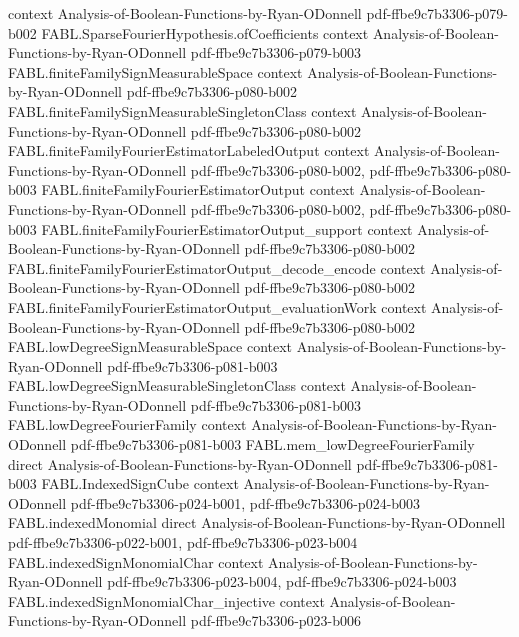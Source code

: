 \begin{theorem}
  {context}
  {Analysis-of-Boolean-Functions-by-Ryan-ODonnell}
  {pdf-ffbe9c7b3306-p079-b002}
\proofstep
  {FABL.SparseFourierHypothesis.ofCoefficients}
  {context}
  {Analysis-of-Boolean-Functions-by-Ryan-ODonnell}
  {pdf-ffbe9c7b3306-p079-b003}
\proofstep
  {FABL.finiteFamilySignMeasurableSpace}
  {context}
  {Analysis-of-Boolean-Functions-by-Ryan-ODonnell}
  {pdf-ffbe9c7b3306-p080-b002}
\proofstep
  {FABL.finiteFamilySignMeasurableSingletonClass}
  {context}
  {Analysis-of-Boolean-Functions-by-Ryan-ODonnell}
  {pdf-ffbe9c7b3306-p080-b002}
\proofstep
  {FABL.finiteFamilyFourierEstimatorLabeledOutput}
  {context}
  {Analysis-of-Boolean-Functions-by-Ryan-ODonnell}
  {pdf-ffbe9c7b3306-p080-b002,
    pdf-ffbe9c7b3306-p080-b003}
\proofstep
  {FABL.finiteFamilyFourierEstimatorOutput}
  {context}
  {Analysis-of-Boolean-Functions-by-Ryan-ODonnell}
  {pdf-ffbe9c7b3306-p080-b002,
    pdf-ffbe9c7b3306-p080-b003}
\proofstep
  {FABL.finiteFamilyFourierEstimatorOutput_support}
  {context}
  {Analysis-of-Boolean-Functions-by-Ryan-ODonnell}
  {pdf-ffbe9c7b3306-p080-b002}
\proofstep
  {FABL.finiteFamilyFourierEstimatorOutput_decode_encode}
  {context}
  {Analysis-of-Boolean-Functions-by-Ryan-ODonnell}
  {pdf-ffbe9c7b3306-p080-b002}
\proofstep
  {FABL.finiteFamilyFourierEstimatorOutput_evaluationWork}
  {context}
  {Analysis-of-Boolean-Functions-by-Ryan-ODonnell}
  {pdf-ffbe9c7b3306-p080-b002}
\proofstep
  {FABL.lowDegreeSignMeasurableSpace}
  {context}
  {Analysis-of-Boolean-Functions-by-Ryan-ODonnell}
  {pdf-ffbe9c7b3306-p081-b003}
\proofstep
  {FABL.lowDegreeSignMeasurableSingletonClass}
  {context}
  {Analysis-of-Boolean-Functions-by-Ryan-ODonnell}
  {pdf-ffbe9c7b3306-p081-b003}
\proofstep
  {FABL.lowDegreeFourierFamily}
  {context}
  {Analysis-of-Boolean-Functions-by-Ryan-ODonnell}
  {pdf-ffbe9c7b3306-p081-b003}
\proofstep
  {FABL.mem_lowDegreeFourierFamily}
  {direct}
  {Analysis-of-Boolean-Functions-by-Ryan-ODonnell}
  {pdf-ffbe9c7b3306-p081-b003}
\proofstep
  {FABL.IndexedSignCube}
  {context}
  {Analysis-of-Boolean-Functions-by-Ryan-ODonnell}
  {pdf-ffbe9c7b3306-p024-b001,
    pdf-ffbe9c7b3306-p024-b003}
\proofstep
  {FABL.indexedMonomial}
  {direct}
  {Analysis-of-Boolean-Functions-by-Ryan-ODonnell}
  {pdf-ffbe9c7b3306-p022-b001,
    pdf-ffbe9c7b3306-p023-b004}
\proofstep
  {FABL.indexedSignMonomialChar}
  {context}
  {Analysis-of-Boolean-Functions-by-Ryan-ODonnell}
  {pdf-ffbe9c7b3306-p023-b004,
    pdf-ffbe9c7b3306-p024-b003}
\proofstep
  {FABL.indexedSignMonomialChar_injective}
  {context}
  {Analysis-of-Boolean-Functions-by-Ryan-ODonnell}
  {pdf-ffbe9c7b3306-p023-b006}

\end{theorem}
